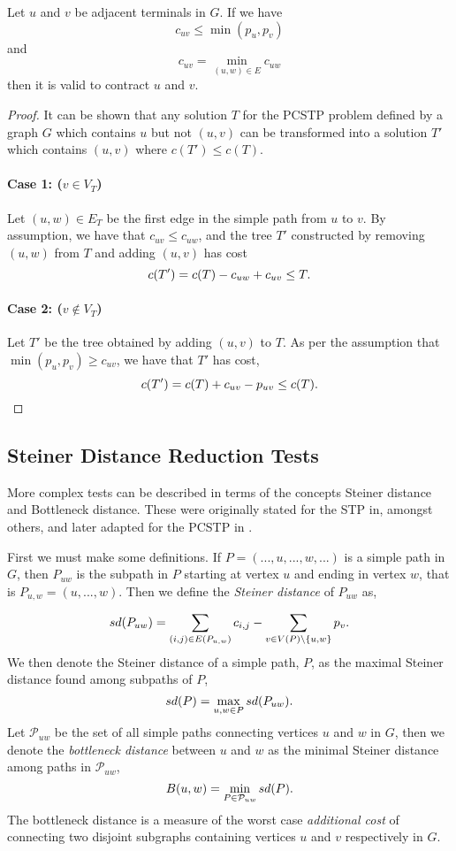 \begin{theorem}
  Let $u$ and $v$ be adjacent terminals in $G$. If we have
  $$c_{uv} \leq \min(p_u, p_v)$$
  and
  $$c_{uv} = \min_{(u, w) \in E}c_{uw}$$
  then it is valid to contract $u$ and $v$.
\end{theorem}
\begin{proof}
  It can be shown that any solution $T$ for the PCSTP problem defined by a graph $G$
  which contains $u$ but not $(u,v)$ can
  be transformed into a solution $T'$ which contains $(u,v)$ where $c(T') \leq c(T)$.

  \paragraph{Case 1: ($v \in V_T$)}
  Let $(u, w) \in E_T$ be the first edge in the simple path from $u$ to $v$. By assumption, we
  have that $c_{uv} \leq c_{uw}$, and the tree $T'$ constructed by removing $(u,w)$ from $T$ and
  adding $(u,v)$ has cost
  $$c(T') = c(T) - c_{uw} + c_{uv} \leq T\mathnormal{.}$$
  \paragraph{Case 2: ($v  \not\in V_T$)}
  Let $T'$ be the tree obtained by adding $(u,v)$ to $T$. As per the assumption that $\min(p_u, p_v) \geq c_{uv}$,
  we have that $T'$ has cost,
  $$c(T') = c(T) + c_{uv} - p_{uv} \leq c(T)\mathnormal{.}$$
\end{proof}


\subsection{Steiner Distance Reduction Tests}\label{sec:sd-red-test}
More complex tests can be described in terms
of the concepts Steiner distance and Bottleneck distance. These were originally stated for
the STP in, amongst others, \cite{duin1989edge,duin1989reduction} and later
adapted for the PCSTP in \cite{uchoa2006reduction}.

First we must make some definitions.
If $P = (..., u, ..., w, ...)$ is a simple path in $G$, then $P_{uw}$ is
the subpath in $P$ starting at vertex $u$ and ending in vertex $w$,
that is $P_{u,w} = (u, ...,w)$. Then we define the \textit{Steiner distance} of
 $P_{uw}$ as,

 $$sd(P_{uw}) = \sum_{(i,j) \in E(P_{u,w})} c_{i,j} -
 \sum_{v \in V(P) \setminus \{u,w\}} p_{v}\mathnormal{.}$$
 We then denote the Steiner distance of a simple path, $P$, as the maximal Steiner
 distance found among subpaths of $P$,
 $$sd(P) = \max_{u,w \in P} sd(P_{uw})\mathnormal{.}$$
 Let $\mathcal{P}_{uw}$ be the set of all simple paths
 connecting vertices $u$ and $w$ in
 $G$, then we denote the \textit{bottleneck distance} between $u$ and $w$ as the minimal Steiner
  distance among paths in $\mathcal{P}_{uw}$,
  $$B(u,w) = \min_{P \in  \mathcal{P}_{uw}} sd(P)\mathnormal{.}$$
  The bottleneck distance is a measure of the worst case \textit{additional cost}
 of connecting
 two disjoint subgraphs containing vertices $u$ and $v$ respectively in $G$.

